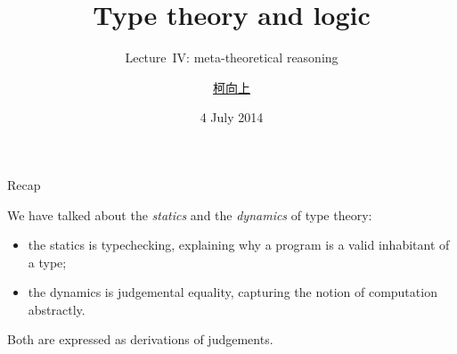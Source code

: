 \documentclass[t,compress,hyperref={hidelinks}]{beamer}
\newcommand{\lectureno}{IV}
\begin{document}

\title{Type theory and logic}
\subtitle{Lecture~\lectureno: meta-theoretical reasoning}
\date{4 July 2014}
\author{{\href{http://www.cs.ox.ac.uk/people/hsiang-shang.ko/}{柯向上}}}

{
\begin{frame}
\titlepage
\end{frame}}

\begin{frame}{Recap}

We have talked about the \emph{statics} and the \emph{dynamics} of type theory:
\begin{itemize}
\item the statics is typechecking, explaining why a program is a valid inhabitant of a type;
\item the dynamics is judgemental equality, capturing the notion of computation abstractly.
\end{itemize}

Both are expressed as derivations of judgements.

\end{frame}
\end{document}
